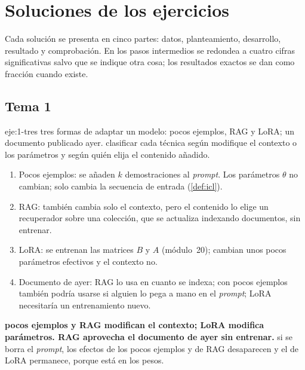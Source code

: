 \chapter{Soluciones de los ejercicios}
\label{ap:soluciones}

Cada solución se presenta en cinco partes: datos, planteamiento, desarrollo, resultado y comprobación. En los pasos intermedios se redondea a cuatro cifras significativas salvo que se indique otra cosa; los resultados exactos se dan como fracción cuando existe.

\section{Tema 1}

\begin{solucion}{eje:1-tres}
\datos tres formas de adaptar un modelo: pocos ejemplos, RAG y LoRA; un documento publicado ayer.
\planteamiento clasificar cada técnica según modifique el contexto o los parámetros y según quién elija el contenido añadido.
\pasos
\begin{enumerate}[label=\arabic*.]
  \item Pocos ejemplos: se añaden $k$ demostraciones al \emph{prompt}. Los parámetros $\theta$ no cambian; solo cambia la secuencia de entrada (\cref{def:icl}).
  \item RAG: también cambia solo el contexto, pero el contenido lo elige un recuperador sobre una colección, que se actualiza indexando documentos, sin entrenar.
  \item LoRA: se entrenan las matrices $B$ y $A$ (módulo~20); cambian unos pocos parámetros efectivos y el contexto no.
  \item Documento de ayer: RAG lo usa en cuanto se indexa; con pocos ejemplos también podría usarse si alguien lo pega a mano en el \emph{prompt}; LoRA necesitaría un entrenamiento nuevo.
\end{enumerate}
\resultado \textbf{pocos ejemplos y RAG modifican el contexto; LoRA modifica parámetros. RAG aprovecha el documento de ayer sin entrenar.}
\comprobacion si se borra el \emph{prompt}, los efectos de los pocos ejemplos y de RAG desaparecen y el de LoRA permanece, porque está en los pesos.
\end{solucion}

